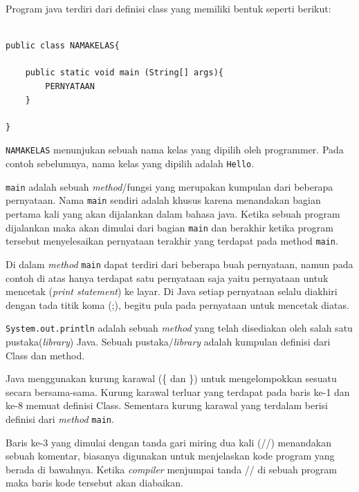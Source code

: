 Program java terdiri dari definisi class yang memiliki bentuk seperti berikut:

\begin{lstlisting}

public class NAMAKELAS{

	public static void main (String[] args){
		PERNYATAAN	
	}

}

\end{lstlisting}

\texttt{NAMAKELAS} menunjukan sebuah nama kelas yang dipilih oleh programmer. Pada contoh sebelumnya, nama kelas yang dipilih adalah \texttt{Hello}.

\texttt{main} adalah sebuah \textit{method}/fungsi yang merupakan kumpulan dari beberapa pernyataan. Nama \texttt{main} sendiri adalah khusus karena menandakan bagian pertama kali yang akan dijalankan dalam bahasa java. Ketika sebuah program dijalankan maka akan dimulai dari bagian \texttt{main} dan berakhir ketika program tersebut menyelesaikan pernyataan terakhir yang terdapat pada method \texttt{main}.

Di dalam \textit{method} \texttt{main} dapat terdiri dari beberapa buah pernyataan, namun pada contoh di atas hanya terdapat satu pernyataan saja yaitu pernyataan untuk mencetak (\textit{print statement}) ke layar. Di Java setiap pernyataan selalu diakhiri dengan tada titik koma (;), begitu pula pada pernyataan untuk mencetak diatas. 

\texttt{System.out.println} adalah sebuah \textit{method} yang telah disediakan oleh salah satu pustaka(\textit{library}) Java. Sebuah pustaka/\textit{library} adalah kumpulan definisi dari Class dan method.

Java menggunakan kurung karawal (\{ dan \}) untuk mengelompokkan sesuatu secara bersama-sama. Kurung karawal terluar yang terdapat pada baris ke-1 dan ke-8 memuat definisi Class. Sementara kurung karawal yang terdalam berisi definisi dari \textit{method }\texttt{main}.

Baris ke-3 yang dimulai dengan tanda gari miring dua kali (//) menandakan sebuah komentar, biasanya digunakan untuk menjelaskan kode program yang berada di bawahnya. Ketika \textit{compiler} menjumpai tanda // di sebuah program maka baris kode tersebut akan diabaikan.
  
